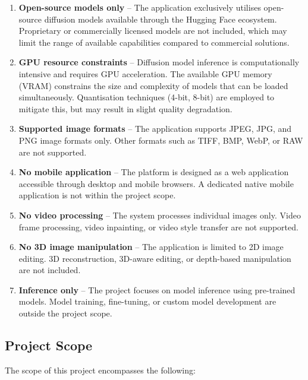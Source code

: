 \documentclass[12pt,a4paper]{report}
\begin{document}
\begin{enumerate}
    \item \textbf{Open-source models only} -- The application exclusively utilises open-source diffusion models available through the Hugging Face ecosystem. Proprietary or commercially licensed models are not included, which may limit the range of available capabilities compared to commercial solutions.
    \item \textbf{GPU resource constraints} -- Diffusion model inference is computationally intensive and requires GPU acceleration. The available GPU memory (VRAM) constrains the size and complexity of models that can be loaded simultaneously. Quantisation techniques (4-bit, 8-bit) are employed to mitigate this, but may result in slight quality degradation.
    \item \textbf{Supported image formats} -- The application supports JPEG, JPG, and PNG image formats only. Other formats such as TIFF, BMP, WebP, or RAW are not supported.
    \item \textbf{No mobile application} -- The platform is designed as a web application accessible through desktop and mobile browsers. A dedicated native mobile application is not within the project scope.
    \item \textbf{No video processing} -- The system processes individual images only. Video frame processing, video inpainting, or video style transfer are not supported.
    \item \textbf{No 3D image manipulation} -- The application is limited to 2D image editing. 3D reconstruction, 3D-aware editing, or depth-based manipulation are not included.
    \item \textbf{Inference only} -- The project focuses on model inference using pre-trained models. Model training, fine-tuning, or custom model development are outside the project scope.
\end{enumerate}

\subsection{Project Scope}

The scope of this project encompasses the following:
\end{document}
